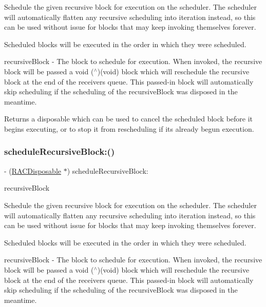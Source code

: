 Schedule the given recursive block for execution on the scheduler. The scheduler will automatically flatten any recursive scheduling into iteration instead, so this can be used without issue for blocks that may keep invoking themselves forever.

Scheduled blocks will be executed in the order in which they were scheduled.

recursive\+Block -\/ The block to schedule for execution. When invoked, the recursive block will be passed a {\ttfamily void ($^\wedge$)(void)} block which will reschedule the recursive block at the end of the receiver\textquotesingle{}s queue. This passed-\/in block will automatically skip scheduling if the scheduling of the {\ttfamily recursive\+Block} was disposed in the meantime.

Returns a disposable which can be used to cancel the scheduled block before it begins executing, or to stop it from rescheduling if it\textquotesingle{}s already begun execution. \mbox{\label{interface_r_a_c_scheduler_aff5ee7293a775dc51a4ae35fb91ab13b}} 
\subsubsection{\texorpdfstring{schedule\+Recursive\+Block\+:()}{scheduleRecursiveBlock:()}\hspace{0.1cm}{\footnotesize\ttfamily [2/3]}}
{\footnotesize\ttfamily -\/ (\mbox{\hyperlink{interface_r_a_c_disposable}{R\+A\+C\+Disposable}} $\ast$) schedule\+Recursive\+Block\+: \begin{DoxyParamCaption}\item[{(R\+A\+C\+Scheduler\+Recursive\+Block)}]{recursive\+Block }\end{DoxyParamCaption}}

Schedule the given recursive block for execution on the scheduler. The scheduler will automatically flatten any recursive scheduling into iteration instead, so this can be used without issue for blocks that may keep invoking themselves forever.

Scheduled blocks will be executed in the order in which they were scheduled.

recursive\+Block -\/ The block to schedule for execution. When invoked, the recursive block will be passed a {\ttfamily void ($^\wedge$)(void)} block which will reschedule the recursive block at the end of the receiver\textquotesingle{}s queue. This passed-\/in block will automatically skip scheduling if the scheduling of the {\ttfamily recursive\+Block} was disposed in the meantime.

